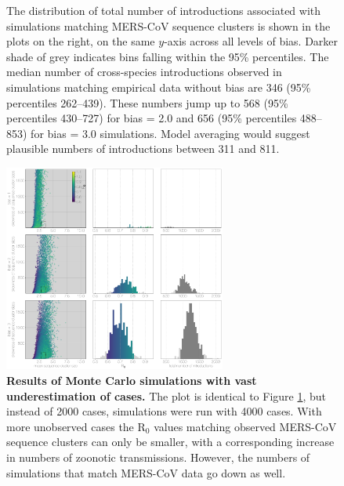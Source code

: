 \documentclass[9pt,lineno]{elife}
\begin{document}
\begin{figure}[h]
{The distribution of total number of introductions associated with simulations matching MERS-CoV sequence clusters is shown in the plots on the right, on the same $y$-axis across all levels of bias.
Darker shade of grey indicates bins falling within the 95\% percentiles.
The median number of cross-species introductions observed in simulations matching empirical data without bias are 346 (95\% percentiles 262--439).
These numbers jump up to 568 (95\% percentiles 430--727) for bias = 2.0 and 656 (95\% percentiles 488--853) for bias = 3.0 simulations.
Model averaging would suggest plausible numbers of introductions between 311 and 811.
	}
	\label{mers_epi_grid}
\end{figure}

\begin{figure}[h]
\centering
	\includegraphics[width=0.65\textwidth]{figures/mers_epi_4000c.png}
	\caption{\textbf{Results of Monte Carlo simulations with vast underestimation of cases.}
The plot is identical to Figure \ref{mers_epi_grid}, but instead of 2000 cases,
simulations were run with 4000 cases.
With more unobserved cases the R$_{0}$ values matching observed MERS-CoV sequence clusters can only be smaller, with a corresponding increase in numbers of zoonotic transmissions.
However, the numbers of simulations that match MERS-CoV data go down as well.
	}
	\label{extra_cases}
\end{figure}
\end{document}

